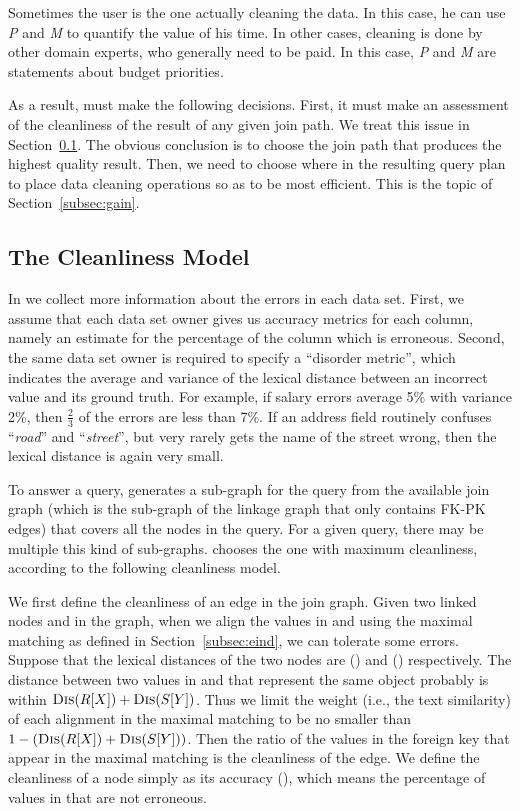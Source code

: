 Sometimes the user is the one actually cleaning the data. In this case, he can use \emph{P} and \emph{M} to quantify the value of his time. In other cases, cleaning is done by other domain experts, who generally need to be paid. In this case, \emph{P} and \emph{M} are statements about budget priorities.



As a result, \dcv must make the following decisions.  First, it must make an assessment of the cleanliness of the result of any given join path.  We treat this issue in Section~\ref{subsec:model}. The obvious conclusion is to choose the join path that produces the highest quality result.  Then, we need to choose where in the resulting query plan to place data cleaning operations so as to be most efficient.  This is the topic of Section~\ref{subsec:gain}.


\subsection{The Cleanliness Model}
\label{subsec:model}



In \dcv we collect more information about the errors in each data set. First, we assume that each data set owner gives us accuracy metrics for each column, namely an estimate for the percentage of the column which is erroneous. Second, the same data set owner is required to specify a “disorder metric”, which indicates the average and variance of the lexical distance between an incorrect value and its ground truth. For example, if salary errors average 5\% with variance 2\%, then $\frac{2}{3}$ of the errors are less than 7\%. If an address field routinely confuses ``\textit{road}'' and ``\textit{street}'', but very rarely gets the name of the street wrong, then the lexical distance is again very small. 



To answer a query, \dcv generates a sub-graph for the query from the available join graph (which is the sub-graph of the linkage graph that only contains FK-PK edges) that covers all the nodes in the query. For a given query, there may be multiple this kind of sub-graphs. \dcv chooses the one with maximum cleanliness, according to the following cleanliness model. 



We first define the cleanliness of an edge in the join graph. Given two linked nodes \RX and \SY in the graph, when we align the values in \RX and \SY using the maximal matching as defined in Section~\ref{subsec:eind}, we can tolerate some errors. Suppose that the lexical distances of the two nodes are \Dis(\RX) and \Dis(\SY) respectively. The distance between two values in \RX and \SY that represent the same object probably is within $\textsc{Dis}(R[X]) + \textsc{Dis}(S[Y])$. Thus we limit the weight (i.e., the text similarity) of each alignment in the maximal matching to be no smaller than $1-(\textsc{Dis}(R[X])+\textsc{Dis}(S[Y]))$. Then the ratio of the values in the foreign key that appear in the maximal matching is the cleanliness of the edge. We define the cleanliness of a node \RX simply as its accuracy \Acc(\RX), which means the percentage of values in \RX that are not erroneous.

